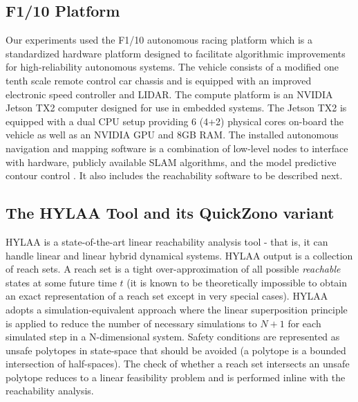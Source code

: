 \documentclass[runningheads]{llncs}
\begin{document}
\subsection{F1/10 Platform}
Our experiments used the F1/10 autonomous racing platform which is a standardized hardware platform designed to facilitate algorithmic improvements for high-reliability autonomous systems. The vehicle consists of a modified one tenth scale remote control car chassis and is equipped with an improved electronic speed controller and LIDAR. The compute platform is an NVIDIA Jetson TX2 computer designed for use in embedded systems. The Jetson TX2 is equipped with a dual CPU setup providing 6 (4+2) physical cores on-board the vehicle as well as an NVIDIA GPU and 8GB RAM. The installed autonomous navigation and mapping software is a combination of low-level nodes to interface with hardware, publicly available SLAM algorithms, and the model predictive contour control \cite{mpcc}. 
It also includes the reachability software to be described next.

\subsection{The HYLAA Tool and its QuickZono variant}
HYLAA \cite{hylaa} is a state-of-the-art linear reachability analysis tool - that is, it can handle linear and linear hybrid dynamical systems.
HYLAA output is a collection of reach sets. A reach set is a tight over-approximation of all possible \emph{reachable} states at some future time $t$ (it is known to be theoretically impossible to obtain an exact representation of a reach set except in very special cases). 
HYLAA adopts a simulation-equivalent approach where the linear superposition principle is applied to reduce the number of necessary simulations to $N+1$ for each simulated step in a N-dimensional system. 
Safety conditions are represented as unsafe polytopes in state-space that should be avoided (a polytope is a bounded intersection of half-spaces). 
The check of whether a reach set intersects an unsafe polytope reduces to a linear feasibility problem and is performed inline with the reachability analysis. 
\end{document}
